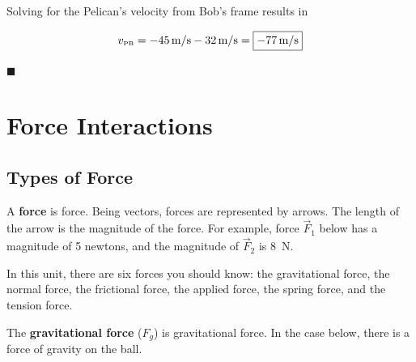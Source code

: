 \documentclass[dvipsnames]{article}
\newif\ifShowUnitII
\begin{document}
Solving for the Pelican's velocity from Bob's frame results in

\begin{equation*}
    v_\text{\tiny PB} = \SI{-45}{m/s} - \SI{32}{m/s} =  \boxed{\SI{-77}{m/s}}
\end{equation*}

\hfill $\blacksquare$


\fi

\clearpage

\section{Force Interactions}

\ifShowUnitII
\setcounter{example}{0}

\subsection{Types of Force}


A \textbf{\gls{force}} is \glsdesc{force}. Being vectors, forces are represented by arrows. The length of the arrow is the magnitude of the force. For example, force $\vec{F}_1$ below has a magnitude of 5 newtons, and the magnitude of $\vec{F}_2$ is \SI{8}{N}.

\begin{center}
\end{center}

In this unit, there are six forces you should know: the gravitational force, the normal force, the frictional force, the applied force, the spring force, and the tension force.

The \textbf{\gls{gravitational force}} ($F_g$) is \glsdesc{gravitational force}. In the case below, there is a force of gravity on the ball. 

\begin{center}
\end{center}
\end{document}

